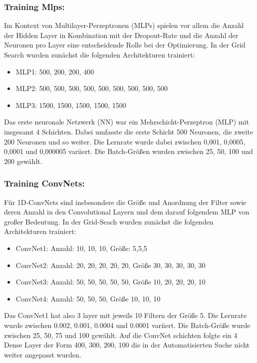 \documentclass[acmtog, authorversion]{acmart} %
\begin{document}
\subsubsection{Training Mlps: }
Im Kontext von Multilayer-Perzeptronen (MLPs) spielen vor allem die Anzahl der Hidden Layer in Kombination mit der Dropout-Rate und die Anzahl der Neuronen pro Layer eine entscheidende Rolle bei der Optimierung. In der Grid Search wurden zunächst die folgenden Architekturen trainiert:
\begin{itemize}
    \item MLP1: 500, 200, 200, 400
    \item MLP2: 500, 500, 500, 500, 500, 500, 500, 500, 500
    \item MLP3: 1500, 1500, 1500, 1500, 1500
\end{itemize}
Das erste neuronale Netzwerk (NN) war ein Mehrschicht-Perzeptron (MLP) mit insgesamt 4 Schichten. Dabei umfasste die erste Schicht 500 Neuronen, die zweite 200 Neuronen und so weiter. Die Lernrate wurde dabei zwischen 0,001, 0,0005, 0,0001 und 0,000005 variiert. Die Batch-Größen wurden zwischen 25, 50, 100 und 200 gewählt.
\subsubsection{Training ConvNets: }
Für 1D-ConvNets sind insbesondere die Größe und Anordnung der Filter sowie deren Anzahl in den Convolutional Layern und dem darauf folgendem MLP von großer Bedeutung. 
In der Grid-Seach wurden zunächst die folgenden Architekturen trainiert:
\begin{itemize}
    \item ConvNet1: Anzahl: 10, 10, 10, Größe: 5,5,5 
    \item ConvNet2: Anzahl: 20, 20, 20, 20, 20, Größe 30, 30, 30, 30, 30
    \item ConvNet3: Anzahl: 50, 50, 50, 50, 50, Größe 10, 20, 20, 20, 10
    \item ConvNet4: Anzahl: 50, 50, 50,  Größe 10, 10, 10
\end{itemize}
Das ConvNet1 hat also 3 layer mit jeweils 10 Filtern der Größe 5.
Die Lernrate wurde zwischen 0.002, 0.001, 0.0004 und 0.0001 variiert. Die Batch-Größe wurde zwischen 25, 50, 75 und 100 gewählt.
Auf die ConvNet schichten folgte ein 4 Dense Layer der Form 400, 300, 200, 100 die in der Automatisierten Suche nicht weiter angepasst wurden.
\end{document}
